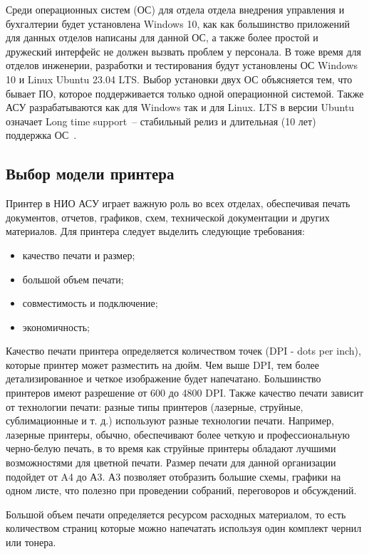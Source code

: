Среди операционных систем (ОС) для отдела отдела внедрения управления и бухгалтерии будет установлена Windows 10, как как большинство приложений для данных 
отделов написаны для данной ОС, а также более простой и дружеский интерфейс не должен вызвать проблем у персонала. 
В тоже время для отделов инженерии, разработки и тестирования будут установлены ОС Windows 10 и Linux Ubuntu 23.04 LTS. Выбор установки двух ОС объясняется тем,
что бывает ПО, которое поддерживается только одной операционной системой. Также АСУ разрабатываются как для Windows так и для Linux. LTS в версии Ubuntu означает 
Long time support~-- стабильный релиз и длительная (10 лет) поддержка ОС~\cite{ubuntu}.

\subsection{Выбор модели принтера}

Принтер в НИО АСУ играет важную роль во всех отделах, 
обеспечивая печать документов, отчетов, графиков, схем, технической документации и других материалов.
Для принтера следует выделить следующие требования:

\begin{itemize}
    \item качество печати и размер;
    \item большой объем печати;
    \item совместимость и подключение;
    \item экономичность;
\end{itemize}

Качество печати принтера определяется количеством точек (DPI - dots per inch), которые принтер может разместить на дюйм. 
Чем выше DPI, тем более детализированное и четкое изображение будет напечатано. 
Большинство принтеров имеют разрешение от 600 до 4800 DPI. Также качество печати зависит от технологии печати: разные типы принтеров 
(лазерные, струйные, сублимационные и т. д.) используют разные технологии печати. Например, лазерные принтеры, обычно, обеспечивают 
более четкую и профессиональную черно-белую печать, в то время как струйные принтеры обладают лучшими возможностями для цветной печати.
Размер печати для данной организации подойдет от A4 до А3. А3 позволяет отобразить большие схемы, графики на одном листе, что полезно 
при проведении собраний, переговоров и обсуждений.

Большой объем печати определяется ресурсом расходных материалом, то есть количеством страниц которые можно напечатать используя один комплект 
чернил или тонера.


